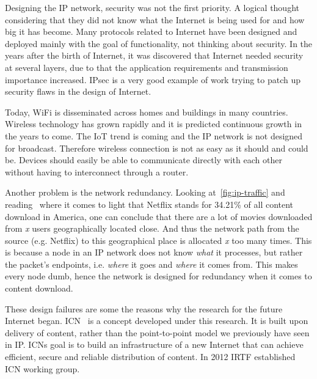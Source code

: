 Designing the \gls{IP} network, security was not the first priority.
A logical thought considering that they did not know what the Internet is being used for and how big it has become.
Many protocols related to Internet have been designed and deployed mainly with the goal of functionality, not thinking about security.
In the years after the birth of Internet, it was discovered that Internet needed security at several layers, due to that the application requirements and transmission importance increased.
\gls{IPsec} is a very good example of work trying to patch up security flaws in the design of Internet.

Today, WiFi is disseminated across homes and buildings in many countries. 
Wireless technology has grown rapidly and it is predicted continuous growth in the years to come. 
The \gls{IoT} trend is coming and the \gls{IP} network is not designed for broadcast.
Therefore wireless connection is not as easy as it should and could be.
Devices should easily be able to communicate directly with each other without having to interconnect through a router.

Another problem is the network redundancy. 
Looking at~\autoref{fig:ip-traffic} and reading~\cite{gipr2014} where it comes to light that Netflix stands for 34.21\% of all content download in America, one can conclude that there are a lot of movies downloaded from \textit{x} users geographically located close.
And thus the network path from the source (e.g. Netflix) to this geographical place is allocated \textit{x} too many times. 
This is because a node in an \gls{IP} network does not know \textit{what} it processes, but rather the packet's endpoints, i.e. \textit{where} it goes and \textit{where} it comes from. 
This makes every node dumb, hence the network is designed for redundancy when it comes to content download.

These design failures are some the reasons why the research for the future Internet began.  
\gls{ICN}~\cite{DBLP:journals/cm/AhlgrenDIKO12} is a concept developed under this research.
It is built upon delivery of content, rather than the point-to-point model we previously have seen in \gls{IP}.
\gls{ICN}s goal is to build an infrastructure of a new Internet that can achieve efficient, secure and reliable distribution of content.
In 2012 \gls{IRTF} established \gls{ICN} working group.


